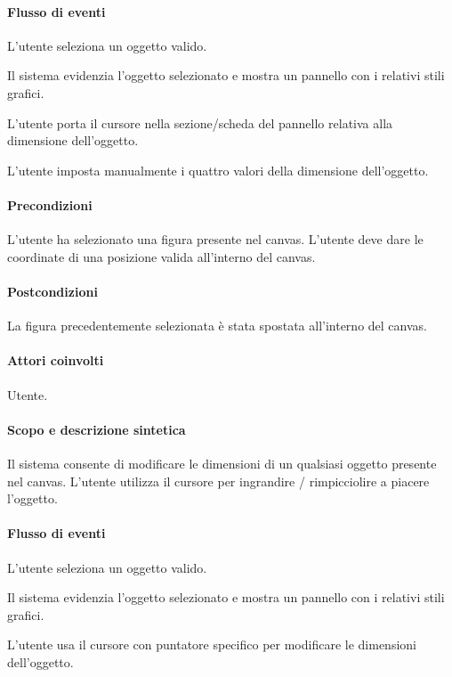 \paragraph{Flusso di eventi}
\begin{elenconumerato}[\textbf{}]{\subsubsecindent}
\item  L'utente seleziona un oggetto valido.
\item  Il sistema evidenzia l'oggetto selezionato e mostra un pannello con i relativi stili grafici.
\item  L'utente porta  il cursore nella sezione/scheda del pannello relativa alla dimensione dell'oggetto.
\item  L'utente imposta manualmente i quattro valori della dimensione dell'oggetto.
\end{elenconumerato}
\paragraph{Precondizioni} L'utente ha selezionato una figura presente nel canvas. L'utente deve dare le coordinate di una posizione valida all'interno del canvas.
\paragraph{Postcondizioni} La figura precedentemente selezionata \`e stata spostata all'interno del canvas.

\paragraph{Attori coinvolti} Utente.
\paragraph{Scopo e descrizione sintetica}  Il sistema consente di modificare le dimensioni  di un qualsiasi oggetto presente nel canvas.  L'utente utilizza il cursore per ingrandire / rimpicciolire a piacere l'oggetto.
\paragraph{Flusso di eventi}
\begin{elenconumerato}[\textbf{}]{\subsubsecindent}
\item  L'utente seleziona un oggetto valido.
\item  Il sistema evidenzia l'oggetto selezionato e mostra un pannello con i relativi stili grafici.
\item  L'utente usa il cursore con puntatore specifico per modificare le dimensioni dell'oggetto.
\end{elenconumerato}
